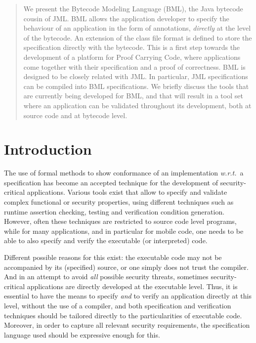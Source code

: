 \begin{abstract} 

We present the Bytecode Modeling Language (BML), the Java bytecode
cousin of JML. BML allows the application developer to specify the
behaviour of an application in the form of annotations,
\emph{directly} at the level of the bytecode. An extension of the class file
format is defined to store the specification directly with the
bytecode. This is a first step towards the development of a platform
for Proof Carrying Code, where applications come together with their
specification and a proof of correctness. BML is designed to be
closely related with JML. In particular, JML specifications can be
compiled into BML specifications. We briefly discuss the tools that
are currently being developed for BML, and that will result in a tool
set where an application can be validated throughout its development,
both at source code and at bytecode level.

\end{abstract}

\section{Introduction}\label{IntroSectLab}

The use of formal methods to show conformance of an implementation
\emph{w.r.t.}\ a specification has become an accepted technique 
for the development of security-critical applications. Various tools
exist that allow to specify and validate complex functional or
security properties, using different techniques such as runtime
assertion checking, testing and verification condition generation.
However, often these techniques are restricted to source code level
programs, while for many applications, and in particular for mobile
code, one needs to be able to also specify and verify the executable
(or interpreted) code.

Different possible reasons for this exist: the executable code may not
be accompanied by its (specified) source, or one simply does not trust
the compiler. And in an attempt to avoid \emph{all} possible security
threats, sometimes security-critical applications are directly
developed at the executable level. Thus, it is essential to have the
means to specify \emph{and} to verify an application directly at this
level, without the use of a compiler, and both specification and
verification techniques should be tailored directly to the
particularities of executable code. Moreover, in order to capture all
relevant security requirements, the specification language used should
be expressive enough for this.

